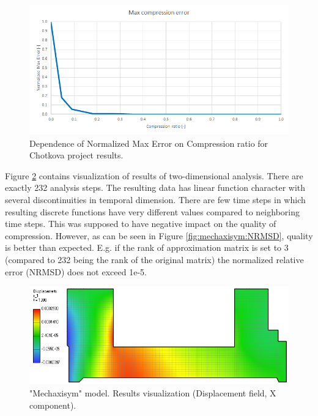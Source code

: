 \begin{figure}[H]
\centering\includegraphics[width=\textwidth]{figures/chotkova_MaxError}
\caption{Dependence of Normalized Max Error on Compression ratio for Chotkova project results.}
\label{fig:chotkova:MaxError}
\end{figure}

Figure \ref{fig:mechaxisym:mesh} contains visualization of results of two-dimensional analysis. There are exactly 232 analysis steps. The resulting data has linear function character with several discontinuities in temporal dimension. There are few time steps in which resulting discrete functions have very different values compared to neighboring time steps. This was supposed to have negative impact on the quality of compression. However, as can be seen in Figure \ref{fig:mechaxisym:NRMSD}, quality is better than expected. E.g. if the rank of approximation matrix is set to 3 (compared to 232 being the rank of the original matrix) the normalized relative error (NRMSD) does not exceed 1e-5.

\begin{figure}[H]
\centering\includegraphics[width=\textwidth]{figures/mechaxisym_screenshot}
\caption{"Mechaxisym" model. Results visualization (Displacement field, X component).}
\label{fig:mechaxisym:mesh}
\end{figure}

